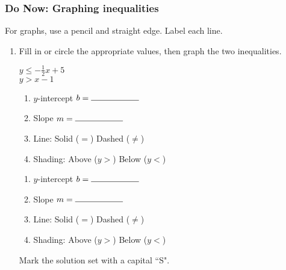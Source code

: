 \documentclass[12pt, twoside]{article}
\begin{document}
\subsubsection*{Do Now: Graphing inequalities}
For graphs, use a pencil and straight edge. Label each line.
  \begin{enumerate}
    \item Fill in or circle the appropriate values, then graph the two inequalities.

      \begin{multicols}{2}
        $y \leq -\frac{1}{2} x +5$ \\
        $y >  x -1$
      \end{multicols}
      \begin{multicols}{2}
        \raggedcolumns
        \begin{enumerate}
          \item $y$-intercept $b= \rule{2cm}{0.15mm}$ \vspace{0.4cm}
          \item Slope \hspace{0.7cm} $m= \rule{2cm}{0.15mm}$
          \item Line: \hspace{0.4cm} Solid ($=$) \hspace{0.4cm} Dashed ($\neq$)
          \item Shading: Above ($y>$) Below ($y<$)
        \end{enumerate}
        \begin{enumerate}
          \item $y$-intercept $b= \rule{2cm}{0.15mm}$ \vspace{0.4cm}
          \item Slope \hspace{0.7cm} $m= \rule{2cm}{0.15mm}$
          \item Line: \hspace{0.4cm} Solid ($=$) \hspace{0.4cm} Dashed ($\neq$)
          \item Shading: Above ($y>$) Below ($y<$)
        \end{enumerate}
      \end{multicols}

      \begin{center} %
      \end{center}
      Mark the solution set with a capital ``S".


\end{enumerate}
\end{document}
